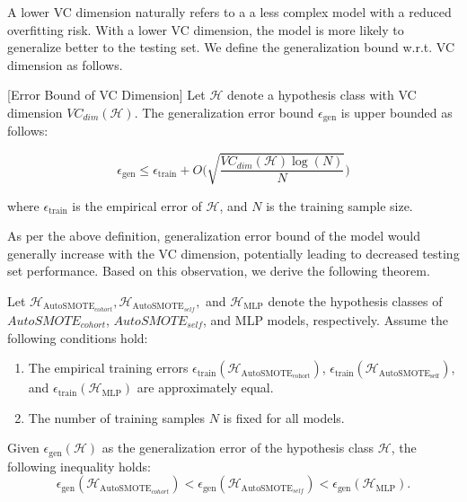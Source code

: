 A lower VC dimension naturally refers to a a less complex model with a reduced overfitting risk. With a lower VC dimension, the model is more likely to generalize better to the testing set. We define the generalization bound w.r.t. VC dimension as follows.

\begin{definition} \label{def:ebvc} [Error Bound of VC Dimension] Let $\mathcal{H}$ denote a hypothesis class with VC dimension $VC_{dim}(\mathcal{H})$.  The generalization error bound $\epsilon_{\text{gen}}$  is upper bounded as follows:

\[ \epsilon_{\text{gen}} \leq \epsilon_{\text{train}} + O\bigg( \sqrt{\frac{VC_{dim}(\mathcal{H}) \log(N)}{N}}\bigg) \]

where $\epsilon_{\text{train}}$ is the empirical error  of $\mathcal{H}$, and $N$ is the training sample size. 
\end{definition}

As per the above definition, generalization error bound of the model would generally increase with the VC dimension, potentially leading to decreased testing set performance. Based on this observation, we derive the following theorem.

\begin{theorem}   \label{thm:thmgen} 
Let $\mathcal{H}_{\text{AutoSMOTE}_{cohort}}, \mathcal{H}_{\text{AutoSMOTE}_{self}},$ and $\mathcal{H}_{\text{MLP}}$ denote the hypothesis classes of $AutoSMOTE_{cohort}$, $AutoSMOTE_{self}$, and MLP models, respectively. Assume the following conditions hold:
\begin{enumerate}
    \item The empirical training errors \(\epsilon_{\text{train}}(\mathcal{H}_{\text{AutoSMOTE}_{\text{cohort}}})\), \(\epsilon_{\text{train}}(\mathcal{H}_{\text{AutoSMOTE}_{\text{self}}})\), and \(\epsilon_{\text{train}}(\mathcal{H}_{\text{MLP}})\) are approximately equal.
    \item The number of training samples \(N\) is fixed for all models.
\end{enumerate}

Given \(\epsilon_{\text{gen}}(\mathcal{H})\) as the generalization error of the hypothesis class \(\mathcal{H}\), the following inequality holds:
\[ \epsilon_{\text{gen}}(\mathcal{H}_{\text{AutoSMOTE}_{cohort}}) < \epsilon_{\text{gen}}(\mathcal{H}_{\text{AutoSMOTE}_{self}}) < \epsilon_{\text{gen}}(\mathcal{H}_{\text{MLP}}). \]
\end{theorem}

